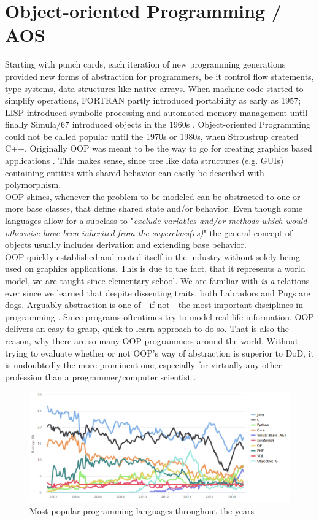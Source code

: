 \section{Object-oriented Programming / AOS}\label{OOP}
Starting with punch cards, each iteration of new programming generations provided new forms of abstraction for programmers, be it control flow statements, type systems, data structures like native arrays. When machine code started to simplify operations, FORTRAN partly introduced portability as early as 1957; LISP introduced symbolic processing and automated memory management until finally Simula/67 introduced objects in the 1960s .
Object-oriented Programming could not be called popular until the 1970s or 1980s, when Stroustrup created C++. Originally OOP was meant to be the way to go for creating graphics based applications  . This makes sense, since tree like data structures (e.g. GUIs) containing entities with shared behavior can easily be described with polymorphism.\\
OOP shines, whenever the problem to be modeled can be abstracted to one or more base classes, that define shared state and/or behavior. Even though some languages allow for a subclass to "\textit{exclude variables and/or methods which would otherwise have been inherited from the superclass(es)}"  the general concept of objects usually includes derivation and extending base behavior.\\
OOP quickly established and rooted itself in the industry without solely being used on graphics applications. This is due to the fact, that it represents a world model, we are taught since elementary school. We are familiar with \textit{is-a} relations ever since we learned that despite dissenting traits, both Labradors and Pugs are dogs. Arguably abstraction is one of - if not - the most important disciplines in programming . Since programs oftentimes try to model real life information, OOP delivers an easy to grasp, quick-to-learn approach to do so. That is also the reason, why there are so many OOP programmers around the world. Without trying to evaluate whether or not OOP's way of abstraction is superior to DoD, it is undoubtedly the more prominent one, especially for virtually any other profession than a programmer/computer scientist .
\begin{figure}[!htbp]
	\centering
	\includegraphics[width=1.0\linewidth]{PICs/lang_ratings}
	\caption{Most popular programming languages throughout the years .}\label{lang_ratings}
\end{figure}
